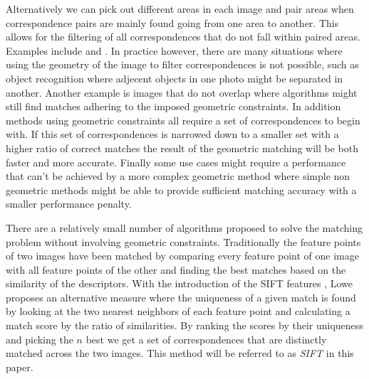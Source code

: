 \documentclass[12pt,journal,compsoc]{IEEEtran}
\begin{document}
%
Alternatively we can pick out different areas in each image and pair 
areas when correspondence pairs are mainly found going from one area to 
another. This allows for the filtering of all correspondences that do 
not fall within paired areas. Examples include \cite{das2008event} and 
\cite{wu2011robust}.
%
%
In practice however, there are many situations where using the geometry 
of the image to filter correspondences is not possible, such as object 
recognition where adjecent objects in one photo might be separated in 
another. Another example is images that do not overlap where algorithms 
might still find matches adhering to the imposed geometric constraints.
In addition methods using geometric constraints all require a set of 
correspondences to begin with. If this set of correspondences is 
narrowed down to a smaller set with a higher ratio of correct matches 
the result of the geometric matching will be both faster and more 
accurate.  Finally some use cases might require a performance that can't 
be achieved by a more complex geometric method where simple non 
geometric methods might be able to provide sufficient matching accuracy 
with a smaller performance penalty.

There are a relatively small number of algorithms proposed to solve the 
matching problem without involving geometric constraints. Traditionally 
the feature points of two images have been matched by comparing every 
feature point of one image with all feature points of the other and 
finding the best matches based on the similarity of the descriptors.  
With the introduction of the SIFT features \cite{lowe2004sift}, Lowe 
proposes an alternative measure where the uniqueness of a given match is 
found by looking at the two nearest neighbors of each feature point and 
calculating a match score by the ratio of similarities. By ranking the 
scores by their uniqueness and picking the $n$ best we get a set of 
correspondences that are distinctly matched across the two images. This 
method will be referred to as \emph{SIFT} in this paper.
\end{document}

